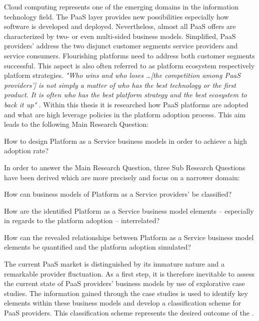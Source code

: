 Cloud computing represents one of the emerging domains in the information technology field. The \ac{PaaS} layer provides new possibilities especially how software is developed and deployed. Nevertheless, almost all \ac{PaaS} offers are characterized by two- or even multi-sided business models. Simplified, \ac{PaaS} providers' address the two disjunct customer segments service providers and service consumers. Flourishing platforms need to address both customer segments successful. This aspect is also often referred to as platform ecosystem respectively platform strategies. \textit{"Who wins and who loses \ldots [the competition among \ac{PaaS} providers'] is not simply a matter of who has the best technology or the first product. It is often who has the best platform strategy and the best ecosystem to back it up"} \citep[p. 34]{Cusumano2010}. Within this thesis it is researched how \ac{PaaS} platforms are adopted and what are high leverage policies in the platform adoption process. This aim leads to the following Main Research Question:

\begin{MRQ}\label{mrq}
How to design Platform as a Service business models in order to achieve a high adoption rate?
\end{MRQ}

In order to answer the Main Research Question, three Sub Research Questions have been derived which are more precisely and focus on a narrower domain:

\begin{SRQ}\label{srq1}
How can business models of Platform as a Service providers' be classified?
\end{SRQ}

\begin{SRQ}\label{srq2}
How are the identified Platform as a Service business model elements -- especially in regards to the platform adoption -- interrelated?
\end{SRQ}

\begin{SRQ}\label{srq3}
How can the revealed relationships between Platform as a Service business model elements be quantified and the platform adoption simulated?
\end{SRQ}

The current \ac{PaaS} market is distinguished by its immature nature and a remarkable provider fluctuation. As a first step, it is therefore inevitable to assess the current state of \ac{PaaS} providers' business models by use of explorative case studies. The information gained through the case studies is used to identify key elements within these business models and develop a classification scheme for \ac{PaaS} providers. This classification scheme represents the desired outcome of the . 


